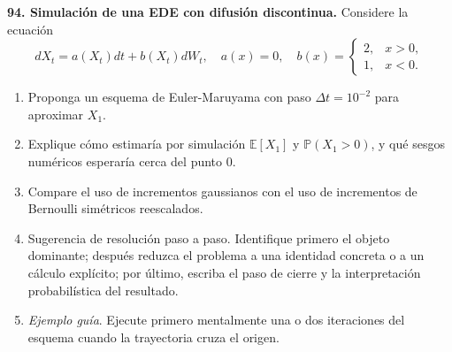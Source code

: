 \documentclass[11pt, letterpaper]{article}
\begin{document}
\newpage
\begin{ejercicio}
    \textbf{94. Simulación de una EDE con difusión discontinua.} Considere la ecuación
    \[ dX_{t}=a(X_{t})dt+b(X_{t})dW_{t}, \quad a(x)=0, \quad b(x)=\begin{cases}2,&x>0,\\ 1,&x<0.\end{cases} \]
    \begin{enumerate}
        \item Proponga un esquema de Euler-Maruyama con paso $\Delta t=10^{-2}$ para aproximar $X_{1}.$
        \item Explique cómo estimaría por simulación $\mathbb{E}[X_{1}]$ y $\mathbb{P}(X_{1}>0)$, y qué sesgos numéricos esperaría cerca del punto 0.
        \item Compare el uso de incrementos gaussianos con el uso de incrementos de Bernoulli simétricos reescalados.
        \item Sugerencia de resolución paso a paso. Identifique primero el objeto dominante; después reduzca el problema a una identidad concreta o a un cálculo explícito; por último, escriba el paso de cierre y la interpretación probabilística del resultado.
        \item \textit{Ejemplo guía}. Ejecute primero mentalmente una o dos iteraciones del esquema cuando la trayectoria cruza el origen.
    \end{enumerate}
\end{ejercicio}

\vspace{5mm}
\end{document}
